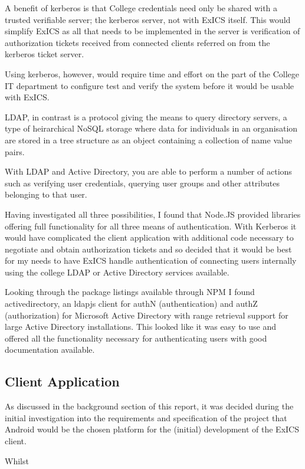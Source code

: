 A benefit of kerberos is that College credentials need only be shared with a trusted verifiable server; the kerberos server, not with ExICS itself.  This would simplify ExICS as all that needs to be implemented in the server is verification of authorization tickets received from connected clients referred on from the kerberos ticket server.

Using kerberos, however, would require time and effort on the part of the College IT department to configure test and verify the system before it would be usable with ExICS.

LDAP, in contrast is a protocol giving the means to query directory servers, a type of heirarchical NoSQL storage where data for individuals in an organisation are stored in a tree structure as an object containing a collection of name value pairs.

With LDAP and Active Directory, you are able to perform a number of actions such as verifying user credentials, querying user groups and other attributes belonging to that user.

Having investigated all three possibilities, I found that Node.JS provided libraries offering full functionality for all three means of authentication.  With Kerberos it would have complicated the client application with additional code necessary to negotiate and obtain authorization tickets and so decided that it would be best for my needs to have ExICS handle authentication of connecting users internally using the college LDAP or Active Directory services available.

Looking through the package listings available through NPM I found activedirectory, an ldapjs client for authN (authentication) and authZ (authorization) for Microsoft Active Directory with range retrieval support for large Active Directory installations.\cite{activedirectory}  This looked like it was easy to use and offered all the functionality necessary for authenticating users with good documentation available.

\subsection{Client Application}

As discussed in the background section of this report, it was decided during the initial investigation into the requirements and specification of the project that Android would be the chosen platform for the (initial) development of the ExICS client.

Whilst 